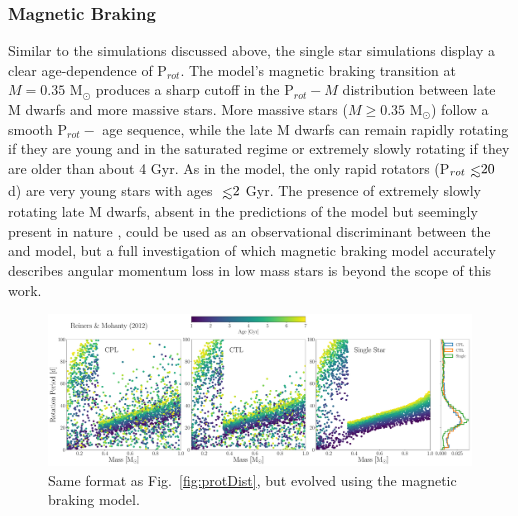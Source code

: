 \documentclass[twocolumn]{aastex61}
\def\lsim{~\rlap{$<$}{\lower 1.0ex\hbox{$\sim$}}}
\begin{document}
\subsubsection{\citet{Reiners2012} Magnetic Braking} \label{sec:reinersDist}

Similar to the \citet{Matt2015} simulations discussed above, the single star simulations display a clear age-dependence of P$_{rot}$. The \citet{Reiners2012} model's magnetic braking transition at $M = 0.35$ M$_{\odot}$ produces a sharp cutoff in the P$_{rot} - M$ distribution between late M dwarfs and more massive stars.  More massive stars ($M \geq 0.35$ M$_{\odot}$) follow a smooth P$_{rot} -$ age sequence, while the late M dwarfs can remain rapidly rotating if they are young and in the saturated regime or extremely slowly rotating if they are older than about 4 Gyr. As in the \citet{Matt2015} model, the only rapid rotators (P$_{rot} \lsim 20$ d) are very young stars with ages $\lsim 2$ Gyr. The presence of extremely slowly rotating late M dwarfs, absent in the predictions of the \citet{Matt2015} model but seemingly present in nature \citep[e.g.][]{Newton2018}, could be used as an observational discriminant between the \citet{Matt2015} and \citet{Reiners2012} model, but a full investigation of which magnetic braking model accurately describes angular momentum loss in low mass stars is beyond the scope of this work. 

\begin{figure}[t]
	\includegraphics[width=\textwidth]{../Plots/protDistReiners.pdf}
   \caption{Same format as Fig.~\ref{fig:protDist}, but evolved using the \citet{Reiners2012} magnetic braking model.}%
    \label{fig:protDistReiners}%
\end{figure}
\end{document}
